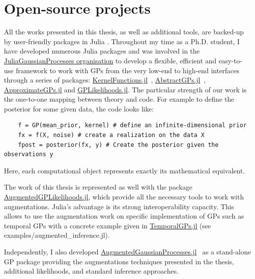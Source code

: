 \section{Open-source projects}

All the works presented in this thesis, as well as additional tools, are backed-up by user-friendly packages in Julia \cite{Julia-2017}.
Throughout my time as a Ph.D. student, I have developed numerous Julia packages and was involved in the \href{https://github.com/JuliaGaussianProcesses}{JuliaGaussianProcesses organisation} to develop a flexible, efficient and easy-to-use framework to work with \ac{GPs} from the very low-end to high-end interfaces through a series of packages: \href{https://github.com/JuliaGaussianProcesses/KernelFunctions.jl}{KernelFunctions.jl}~\cite{theo_galy_fajou_2022_6246597}, \href{https://github.com/JuliaGaussianProcesses/AbstractGPs.jl}{AbstractGPs.jl}~\cite{david_widmann_2022_5939997}, \href{https://github.com/JuliaGaussianProcesses/ApproximateGPs.jl}{ApproximateGPs.jl} and \href{https://github.com/JuliaGaussianProcesses/GPLikelihoods.jl}{GPLikelihoods.jl}.
The particular strength of our work is the one-to-one mapping between theory and code.
For example to define the posterior for some given data, the code looks like:
\begin{verbatim}
    f = GP(mean_prior, kernel) # define an infinite-dimensional prior
    fx = f(X, noise) # create a realization on the data X
    fpost = posterior(fx, y) # Create the posterior given the observations y
\end{verbatim}
Here, each computational object represents exactly its mathematical equivalent.

The work of this thesis is represented as well with the package \href{https://github.com/JuliaGaussianProcesses/AugmentedGPLikelihoods.jl}{AugmentedGPLikelihoods.jl}, which provide all the necessary tools to work with augmentations.
Julia's advantage is its strong interoperability capacity.
This allows to use the augmentation work on specific implementation of \ac{GPs} such as temporal \ac{GPs} with a concrete example given in \href{https://github.com/JuliaGaussianProcesses/TemporalGPs.jl}{TemporalGPs.jl} (see examples/augmented\_inference.jl).

Independently, I also developed \href{https://github.com/theogf/AugmentedGaussianProcesses.jl}{AugmentedGaussianProcesses.jl}~\cite{theo_galy_fajou_2021_5728215} as a stand-alone \ac{GP} package providing the augmentations techniques presented in the thesis, additional likelihoods, and standard inference approaches.


